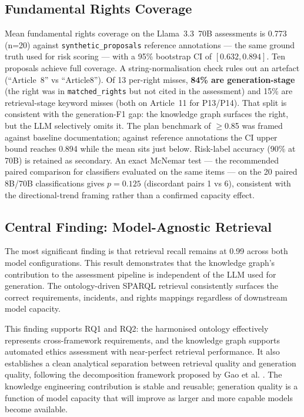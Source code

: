 \subsection{Fundamental Rights Coverage}
\label{sec:rights-coverage}

Mean fundamental rights coverage on the Llama~3.3~70B assessments is 0.773 (n=20) against \texttt{synthetic\_proposals} reference annotations --- the same ground truth used for risk scoring --- with a 95\% bootstrap CI of $[0.632, 0.894]$. Ten proposals achieve full coverage. A string-normalisation check rules out an artefact (``Article~8'' vs ``Article8''). Of 13 per-right misses, \textbf{84\% are generation-stage} (the right was in \texttt{matched\_rights} but not cited in the assessment) and 15\% are retrieval-stage keyword misses (both on Article~11 for P13/P14). That split is consistent with the generation-F1 gap: the knowledge graph surfaces the right, but the LLM selectively omits it. The plan benchmark of $\geq$0.85 was framed against baseline documentation; against reference annotations the CI upper bound reaches 0.894 while the mean sits just below. Risk-label accuracy (90\% at 70B) is retained as secondary. An exact McNemar test --- the recommended paired comparison for classifiers evaluated on the same items \cite{dietterich1998} --- on the 20 paired 8B/70B classifications gives $p=0.125$ (discordant pairs 1 vs 6), consistent with the directional-trend framing rather than a confirmed capacity effect.


\subsection{Central Finding: Model-Agnostic Retrieval}

The most significant finding is that retrieval recall remains at 0.99 across both model configurations. This result demonstrates that the knowledge graph's contribution to the assessment pipeline is independent of the LLM used for generation. The ontology-driven SPARQL retrieval consistently surfaces the correct requirements, incidents, and rights mappings regardless of downstream model capacity.

This finding supports RQ1 and RQ2: the harmonised ontology effectively represents cross-framework requirements, and the knowledge graph supports automated ethics assessment with near-perfect retrieval performance. It also establishes a clean analytical separation between retrieval quality and generation quality, following the decomposition framework proposed by Gao et al. \cite{gao2023rag}. The knowledge engineering contribution is stable and reusable; generation quality is a function of model capacity that will improve as larger and more capable models become available.

